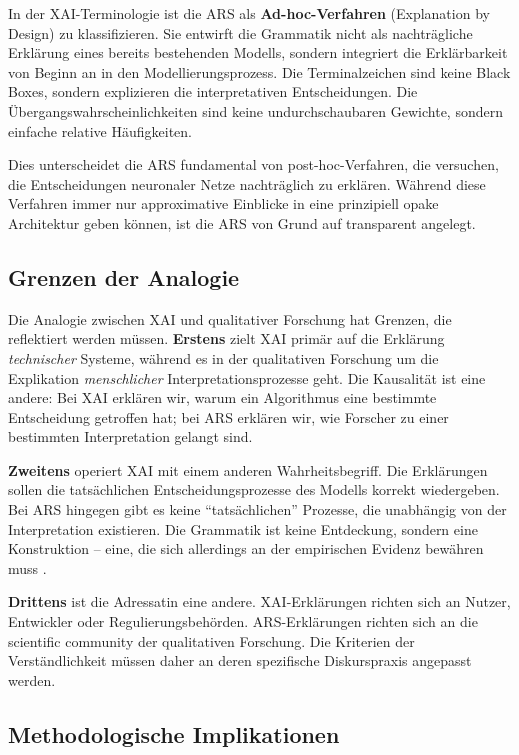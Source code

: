 \documentclass[
  12pt,
  a4paper,
  oneside,
  titlepage
]{article}
\begin{document}
In der XAI-Terminologie ist die ARS als \textbf{Ad-hoc-Verfahren} (Explanation 
by Design) zu klassifizieren. Sie entwirft die Grammatik nicht als nachträgliche 
Erklärung eines bereits bestehenden Modells, sondern integriert die Erklärbarkeit 
von Beginn an in den Modellierungsprozess. Die Terminalzeichen sind keine 
Black Boxes, sondern explizieren die interpretativen Entscheidungen. Die 
Übergangswahrscheinlichkeiten sind keine undurchschaubaren Gewichte, sondern 
einfache relative Häufigkeiten.

Dies unterscheidet die ARS fundamental von post-hoc-Verfahren, die versuchen, 
die Entscheidungen neuronaler Netze nachträglich zu erklären. Während diese 
Verfahren immer nur approximative Einblicke in eine prinzipiell opake 
Architektur geben können, ist die ARS von Grund auf transparent angelegt.

\subsection{Grenzen der Analogie}

Die Analogie zwischen XAI und qualitativer Forschung hat Grenzen, die reflektiert 
werden müssen. \textbf{Erstens} zielt XAI primär auf die Erklärung \textit{technischer} 
Systeme, während es in der qualitativen Forschung um die Explikation 
\textit{menschlicher} Interpretationsprozesse geht. Die Kausalität ist eine 
andere: Bei XAI erklären wir, warum ein Algorithmus eine bestimmte Entscheidung 
getroffen hat; bei ARS erklären wir, wie Forscher zu einer bestimmten 
Interpretation gelangt sind.

\textbf{Zweitens} operiert XAI mit einem anderen Wahrheitsbegriff. Die 
Erklärungen sollen die tatsächlichen Entscheidungsprozesse des Modells korrekt 
wiedergeben. Bei ARS hingegen gibt es keine \enquote{tatsächlichen} Prozesse, 
die unabhängig von der Interpretation existieren. Die Grammatik ist keine 
Entdeckung, sondern eine Konstruktion – eine, die sich allerdings an der 
empirischen Evidenz bewähren muss \citep[ S.~80]{Flick2019}.

\textbf{Drittens} ist die Adressatin eine andere. XAI-Erklärungen richten sich 
an Nutzer, Entwickler oder Regulierungsbehörden. ARS-Erklärungen richten sich 
an die scientific community der qualitativen Forschung. Die Kriterien der 
Verständlichkeit müssen daher an deren spezifische Diskurspraxis angepasst werden.

\subsection{Methodologische Implikationen}
\end{document}
